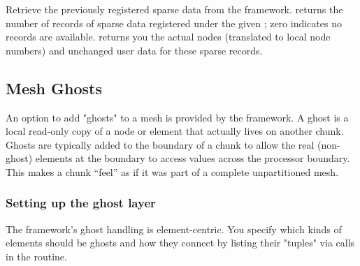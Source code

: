 \documentclass[10pt]{article}
\begin{document}

Retrieve the previously registered sparse data from the framework.
 returns the number of records of sparse
data registered under the given ; zero indicates no records
are available.   returns you the actual nodes
(translated to local node numbers) and unchanged user data for
these sparse records.


\subsection {Mesh Ghosts}
An option to add "ghosts" to a mesh is provided by the framework. A ghost is a local read-only copy of a node or element that actually lives on another chunk.  Ghosts are typically added to the boundary of a chunk to allow the real (non-ghost) elements at the boundary to access values across the processor boundary.  This makes a chunk ``feel'' as if it was part of a complete unpartitioned mesh.

\subsubsection{Setting up the ghost layer}
The framework's ghost handling is element-centric. You specify which kinds of elements should be ghosts and how they connect by listing their "tuples" via calls in the  routine.  
\end{document}
